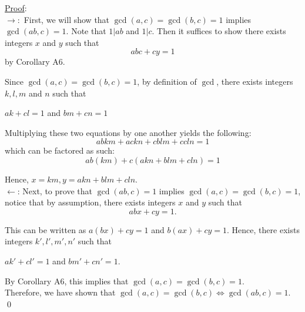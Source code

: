 \documentclass{article}
\begin{document}
\underline{Proof}: \\
$\rightarrow:$ First, we will show that $\gcd(a, c) = \gcd(b, c) = 1$ implies $\gcd(ab, c) = 1.$ Note that $1 \vert ab$ and $1 \vert c.$ Then it suffices to show there exists integers $x$ and $y$ such that
$$abc + cy = 1$$
by Corollary A6.

Since $\gcd(a, c) = \gcd(b, c) = 1$, by definition of $\gcd$, there exists integers $k, l, m$ and $n$ such that
\begin{center}
$ak + cl = 1$ and 
$bm + cn = 1$ 
\end{center}

\noindent
Multiplying these two equations by one another yields the following:
$$abkm + ackn + cblm + ccln = 1$$
which can be factored as such:
$$ab(km) + c(akn + blm + cln) = 1$$

Hence, $x = km, y = akn + blm + cln.$ \\

$\leftarrow$: Next, to prove that $\gcd(ab, c) = 1$ implies $\gcd(a, c) = \gcd(b, c) = 1$, notice that by assumption, there exists integers $x$ and $y$ such that
$$abx + cy = 1.$$

This can be written as $a(bx) + cy = 1$ and $b(ax) + cy = 1$.  Hence, there exists integers $k', l', m', n'$ such that
\begin{center}
	$ak' + cl' = 1$ and $bm' + cn' = 1. $
\end{center}

By Corollary A6, this implies that $\gcd(a, c) = \gcd(b, c) = 1$. \\

Therefore, we have shown that $\gcd(a, c) = \gcd(b, c) \iff \gcd(ab, c) = 1.$ \qed \\
\end{document}
